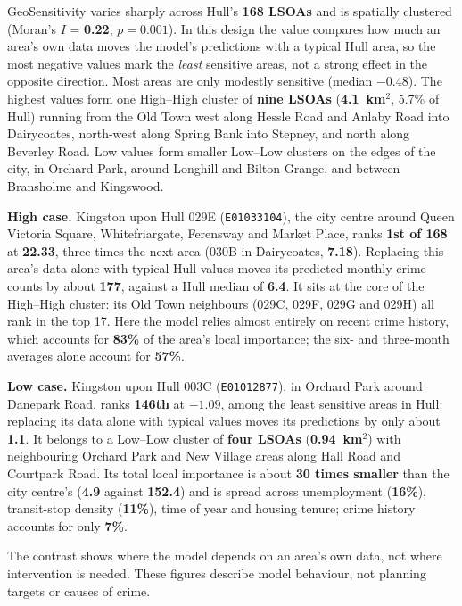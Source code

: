 GeoSensitivity varies sharply across Hull's \textbf{168 LSOAs} and is
spatially clustered (Moran's $I$ = \textbf{0.22}, \textbf{$p=0.001$}). In
this design the value compares how much an area's own data moves the model's
predictions with a typical Hull area, so the most negative values mark the
\emph{least} sensitive areas, not a strong effect in the opposite direction.
Most areas are only modestly sensitive (median \textbf{$-0.48$}). The highest
values form one
High--High cluster of \textbf{nine LSOAs} (\textbf{4.1~km$^2$}, 5.7\% of Hull)
running from the Old Town west along Hessle Road and Anlaby Road into
Dairycoates, north-west along Spring Bank into Stepney, and north along
Beverley Road. Low values form smaller Low--Low clusters on the edges of the
city, in Orchard Park, around Longhill and Bilton Grange, and between Bransholme and Kingswood.

\textbf{High case.} Kingston upon Hull 029E (\texttt{E01033104}), the city
centre around Queen Victoria Square, Whitefriargate, Ferensway and Market
Place, ranks \textbf{1st of 168} at \textbf{22.33}, three times the next area
(030B in Dairycoates, \textbf{7.18}). Replacing this area's data alone with
typical Hull values moves its predicted monthly crime counts by about
\textbf{177}, against a Hull median of \textbf{6.4}. It sits at the core of the High--High
cluster: its Old Town neighbours (029C, 029F, 029G and 029H) all rank in the
top 17. Here the model relies almost entirely on recent crime history, which
accounts for \textbf{83\%} of the area's local importance; the six- and
three-month averages alone account for \textbf{57\%}.

\textbf{Low case.} Kingston upon Hull 003C (\texttt{E01012877}), in Orchard
Park around Danepark Road, ranks \textbf{146th} at \textbf{$-1.09$}, among
the least sensitive areas in Hull: replacing its data alone with typical
values moves its predictions by only about \textbf{1.1}. It
belongs to a Low--Low cluster of \textbf{four LSOAs} (\textbf{0.94~km$^2$})
with neighbouring Orchard Park and New Village areas along Hall Road and
Courtpark Road. Its total local importance is about \textbf{30 times smaller}
than the city centre's (\textbf{4.9} against \textbf{152.4}) and is spread
across unemployment (\textbf{16\%}), transit-stop density (\textbf{11\%}),
time of year and housing tenure; crime history accounts for only
\textbf{7\%}.

The contrast shows where the model depends on an area's own data, not where
intervention is needed. These figures describe model behaviour, not planning
targets or causes of crime.
